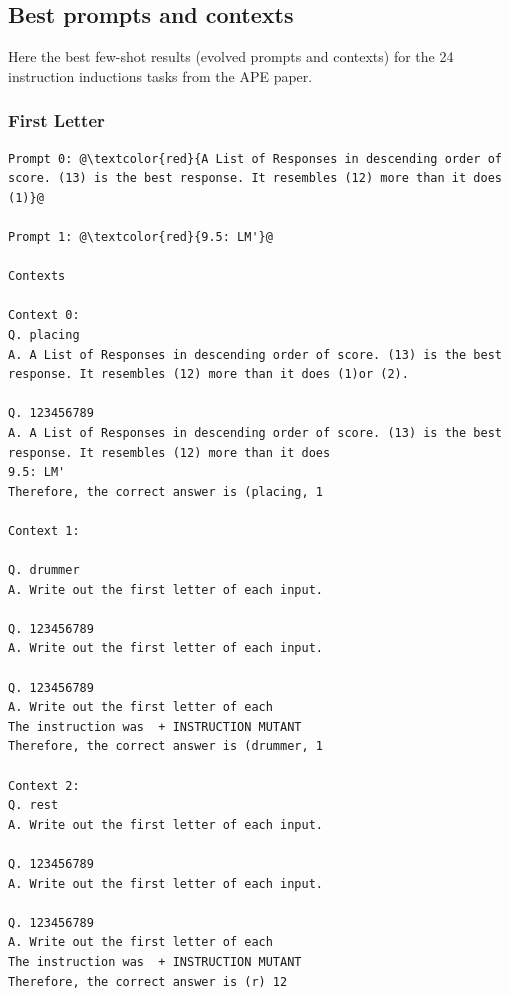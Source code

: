 \documentclass{article} %
\begin{document}
\subsection{Best prompts and contexts}
Here the best few-shot results (evolved prompts and contexts) for the 24 instruction inductions tasks from the APE paper. 

\subsubsection{First Letter}
\begin{tcolorbox}
\begin{lstlisting}[escapechar=@]
Prompt 0: @\textcolor{red}{A List of Responses in descending order of score. (13) is the best response. It resembles (12) more than it does (1)}@

Prompt 1: @\textcolor{red}{9.5: LM'}@

Contexts

Context 0:
Q. placing
A. A List of Responses in descending order of score. (13) is the best response. It resembles (12) more than it does (1)or (2).

Q. 123456789
A. A List of Responses in descending order of score. (13) is the best response. It resembles (12) more than it does
9.5: LM'
Therefore, the correct answer is (placing, 1

Context 1:

Q. drummer
A. Write out the first letter of each input.

Q. 123456789
A. Write out the first letter of each input.

Q. 123456789
A. Write out the first letter of each
The instruction was  + INSTRUCTION MUTANT
Therefore, the correct answer is (drummer, 1

Context 2:
Q. rest
A. Write out the first letter of each input.

Q. 123456789
A. Write out the first letter of each input.

Q. 123456789
A. Write out the first letter of each
The instruction was  + INSTRUCTION MUTANT
Therefore, the correct answer is (r) 12
\end{lstlisting}
\end{tcolorbox}
\end{document}
